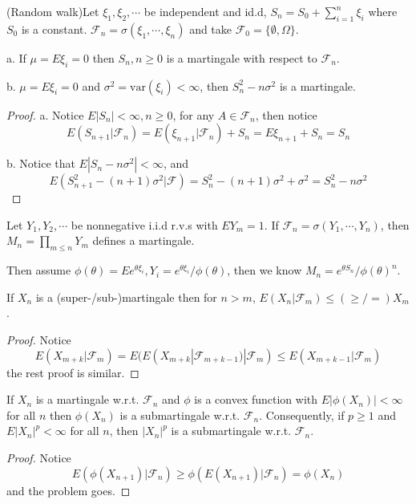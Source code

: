 \documentclass[lang=en, color=blue, ]{elegantbook}
\newcommand{\F}{\mathcal{F}}
\begin{document}
\begin{example}
    (Random walk)Let $\xi_1,\xi_2,\cdots$ be independent and id.d, $S_n = S_0 +\sum\limits_{i=1}^n \xi_i$ where $S_0$ is a constant. $\F_n = \sigma(\xi_1,\cdots,\xi_n)$ and take $\F_0 = \{\emptyset,\Omega\}$.\par
    a. If $\mu = E\xi_i = 0$ then $S_n, n\geq 0$ is a martingale with respect to $\F_n$.\par
    b. $\mu = E\xi_i = 0$ and $\sigma^2 = \text{var}(\xi_i)<\infty$, then $S_n^2-n\sigma^2$ is a martingale.\par
\end{example}
\begin{proof}\par
    a. Notice $E|S_n| < \infty, n\geq 0$, for any $A \in \F_n$, then notice
    \[E(S_{n+1}|\F_n) = E(\xi_{n+1}|\F_n) + S_n = E\xi_{n+1} + S_n = S_n\]\par
    b. Notice that $E|S_n - n\sigma^2|< \infty$, and
    \[E(S_{n+1}^2-(n+1)\sigma^2|\F) = S_n^2-(n+1)\sigma^2 + \sigma^2 = S_n^2 - n\sigma^2 \]
\end{proof}

\begin{example}
Let $Y_1,Y_2,\cdots$ be nonnegative i.i.d r.v.s with $EY_m = 1$. If $\F_n = \sigma(Y_1,\cdots,Y_n)$, then $M_n = \prod_{m\leq n} Y_m$ defines a martingale.\par
Then assume $\phi(\theta) = Ee^{\theta \xi_i},Y_i = e^{\theta \xi_i}/\phi(\theta)$, then we know $M_n = e^{\theta S_n}/ \phi(\theta)^n$.
\end{example}

\begin{theorem}
    If $X_n$ is a (super-/sub-)martingale then for $n>m$, $E(X_n|\F_m)\leq(\geq/=) X_m$.
\end{theorem}
\begin{proof}
    Notice
    \[E(X_{m+k}|\F_m) = E(E(X_{m+k}|\F_{m+k-1})|\F_m) \leq E(X_{m+k-1}|\F_m)\]
    the rest proof is similar.
\end{proof}

\begin{theorem}
    If $X_n$ is a martingale w.r.t. $\F_n$ and $\phi$ is a convex function with $E|\phi(X_n)| < \infty$ for all $n$ then $\phi(X_n)$ is a submartingale w.r.t. $\F_n$. Consequently, if $p\geq 1$ and $E|X_n|^p < \infty$ for all $n$, then $|X_n|^p$ is a submartingale w.r.t. $\F_n$.
\end{theorem}
\begin{proof}
    Notice
    \[E(\phi(X_{n+1})|\F_n) \geq \phi(E(X_{n+1})|\F_n) = \phi(X_n)\]
    and the problem goes.
\end{proof}
\end{document}
